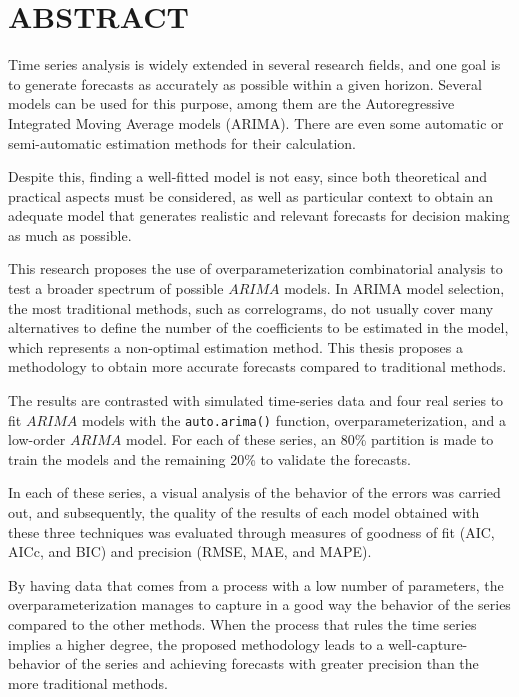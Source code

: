 \documentclass[
]{article}
\begin{document}
\section*{ABSTRACT}

Time series analysis is widely extended in several research fields, and
one goal is to generate forecasts as accurately as possible within a
given horizon. Several models can be used for this purpose, among them
are the Autoregressive Integrated Moving Average models (ARIMA). There
are even some automatic or semi-automatic estimation methods for their
calculation.

Despite this, finding a well-fitted model is not easy, since both
theoretical and practical aspects must be considered, as well as
particular context to obtain an adequate model that generates realistic
and relevant forecasts for decision making as much as possible.

This research proposes the use of overparameterization combinatorial
analysis to test a broader spectrum of possible \(ARIMA\) models. In
ARIMA model selection, the most traditional methods, such as
correlograms, do not usually cover many alternatives to define the
number of the coefficients to be estimated in the model, which
represents a non-optimal estimation method. This thesis proposes a
methodology to obtain more accurate forecasts compared to traditional
methods.

The results are contrasted with simulated time-series data and four real
series to fit \(ARIMA\) models with the \texttt{auto.arima()} function,
overparameterization, and a low-order \(ARIMA\) model. For each of these
series, an 80\% partition is made to train the models and the remaining
20\% to validate the forecasts.

In each of these series, a visual analysis of the behavior of the errors
was carried out, and subsequently, the quality of the results of each
model obtained with these three techniques was evaluated through
measures of goodness of fit (AIC, AICc, and BIC) and precision (RMSE,
MAE, and MAPE).

By having data that comes from a process with a low number of
parameters, the overparameterization manages to capture in a good way
the behavior of the series compared to the other methods. When the
process that rules the time series implies a higher degree, the proposed
methodology leads to a well-capture-behavior of the series and achieving
forecasts with greater precision than the more traditional methods.
\end{document}
